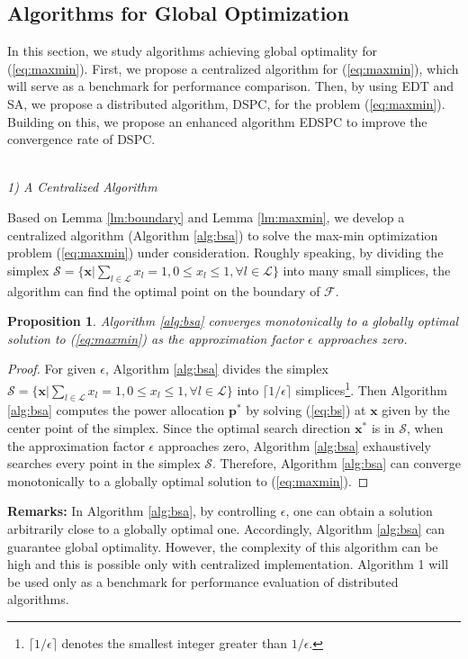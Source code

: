 \documentclass[10pt,journal,letterpaper,compsoc]{IEEEtran}
\newtheorem{prop}{\textbf{Proposition}}[section]
\begin{document}
\subsection{Algorithms for Global Optimization}
In this section, we study algorithms achieving global optimality for (\ref{eq:maxmin}). First, we propose a centralized algorithm for (\ref{eq:maxmin}),
which will serve as a benchmark for performance comparison. Then, by using EDT and SA, we propose a distributed algorithm, DSPC, for the problem (\ref{eq:maxmin}). Building on this, we propose an enhanced algorithm EDSPC to improve the convergence rate of DSPC.
\\
\\
\noindent
{\emph{1) A Centralized Algorithm}

Based on Lemma \ref{lm:boundary} and Lemma \ref{lm:maxmin}, we develop a centralized algorithm (Algorithm \ref{alg:bsa}) to solve the max-min optimization problem (\ref{eq:maxmin}) under consideration. Roughly speaking, by dividing the simplex $\mathcal{S}=\{\mathbf{x}|\sum_{l\in\mathcal{L}} x_l =1, 0\leq x_l\leq 1, \forall l\in\mathcal{L}\}$ into many small simplices, the algorithm can find the optimal point on the boundary of $\mathcal{F}$.

\begin{prop}
Algorithm \ref{alg:bsa} converges monotonically to a globally optimal solution to (\ref{eq:maxmin}) as the approximation factor $\epsilon$ approaches zero.
\end{prop}
\begin{proof}
For given $\epsilon$, Algorithm \ref{alg:bsa} divides the simplex $\mathcal{S}=\{\mathbf{x}|\sum_{l\in\mathcal{L}} x_l =1, 0\leq x_l\leq 1, \forall l\in\mathcal{L}\}$ into $\lceil1/\epsilon\rceil$ simplices\footnote{$\lceil1/\epsilon\rceil$ denotes the smallest integer greater than $1/\epsilon$.}. Then Algorithm \ref{alg:bsa} computes the power allocation $\mathbf{p^*}$ by solving (\ref{eq:bs}) at $\mathbf{x}$ given by the center point of the simplex. Since the optimal search direction $\mathbf{x}^*$ is in $\mathcal{S}$, when the approximation factor $\epsilon$ approaches zero, Algorithm \ref{alg:bsa} exhaustively searches every point in the simplex $\mathcal{S}$. Therefore, Algorithm \ref{alg:bsa} can converge monotonically to a globally optimal solution to (\ref{eq:maxmin}).
\end{proof}

{\bf Remarks:} In Algorithm \ref{alg:bsa},   by controlling $\epsilon$, one can obtain a solution arbitrarily close to a globally optimal one.
  Accordingly, Algorithm \ref{alg:bsa} can guarantee global optimality. However, the complexity of this algorithm can be high and this is possible only with centralized implementation. Algorithm 1 will be used only as a benchmark for performance evaluation of distributed algorithms.

}
\end{document}
